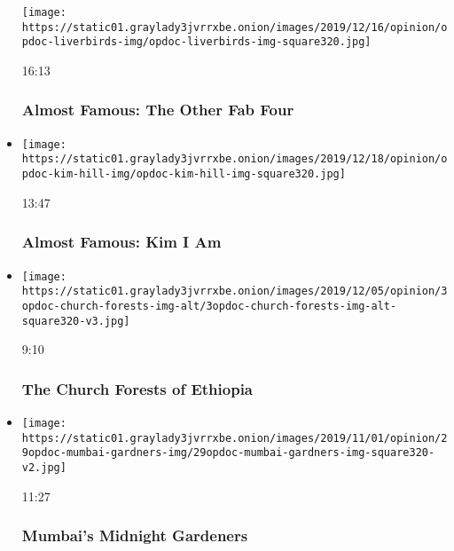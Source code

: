 \begin{itemize}
  \texttt{[image: https://static01.graylady3jvrrxbe.onion/images/2019/12/16/opinion/opdoc-liverbirds-img/opdoc-liverbirds-img-square320.jpg]}

  16:13

  \hypertarget{almost-famous-the-other-fab-four}{%
  \subsubsection{Almost Famous: The Other Fab
  Four}\label{almost-famous-the-other-fab-four}}
\item
  \href{https://www.nytimes3xbfgragh.onion/video/opinion/100000006865878/almost-famous-kim-i-am.html?action=click\&module=video-series-bar\&region=header\&pgtype=Article\&playlistId=video/op-docs}{}

  \texttt{[image: https://static01.graylady3jvrrxbe.onion/images/2019/12/18/opinion/opdoc-kim-hill-img/opdoc-kim-hill-img-square320.jpg]}

  13:47

  \hypertarget{almost-famous-kim-i-am}{%
  \subsubsection{Almost Famous: Kim I Am}\label{almost-famous-kim-i-am}}
\item
  \href{https://www.nytimes3xbfgragh.onion/video/opinion/100000006808736/the-church-forests-of-ethiopia.html?action=click\&module=video-series-bar\&region=header\&pgtype=Article\&playlistId=video/op-docs}{}

  \texttt{[image: https://static01.graylady3jvrrxbe.onion/images/2019/12/05/opinion/3opdoc-church-forests-img-alt/3opdoc-church-forests-img-alt-square320-v3.jpg]}

  9:10

  \hypertarget{the-church-forests-of-ethiopia}{%
  \subsubsection{The Church Forests of
  Ethiopia}\label{the-church-forests-of-ethiopia}}
\item
  \href{https://www.nytimes3xbfgragh.onion/video/opinion/100000006616228/mumbais-midnight-gardeners.html?action=click\&module=video-series-bar\&region=header\&pgtype=Article\&playlistId=video/op-docs}{}

  \texttt{[image: https://static01.graylady3jvrrxbe.onion/images/2019/11/01/opinion/29opdoc-mumbai-gardners-img/29opdoc-mumbai-gardners-img-square320-v2.jpg]}

  11:27

  \hypertarget{mumbais-midnight-gardeners}{%
  \subsubsection{Mumbai's Midnight
  Gardeners}\label{mumbais-midnight-gardeners}}
\end{itemize}

